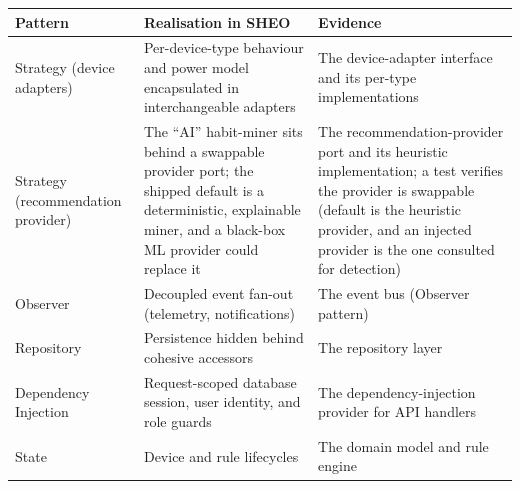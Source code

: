 \begin{center}
\begin{tabularx}{\linewidth}{@{}L{2.6cm} Y L{4.0cm}@{}}
\toprule
\textbf{Pattern} & \textbf{Realisation in SHEO} & \textbf{Evidence} \\
\midrule
Strategy (device adapters) & Per-device-type behaviour and power model encapsulated in interchangeable adapters & The device-adapter interface and its per-type implementations \\
Strategy (recommendation provider) & The ``AI'' habit-miner sits behind a swappable provider port; the shipped default is a deterministic, explainable miner, and a black-box ML provider could replace it & The recommendation-provider port and its heuristic implementation; a test verifies the provider is swappable (default is the heuristic provider, and an injected provider is the one consulted for detection) \\
Observer & Decoupled event fan-out (telemetry, notifications) & The event bus (Observer pattern) \\
Repository & Persistence hidden behind cohesive accessors & The repository layer \\
Dependency Injection & Request-scoped database session, user identity, and role guards & The dependency-injection provider for API handlers \\
State & Device and rule lifecycles & The domain model and rule engine \\
\bottomrule
\end{tabularx}
\end{center}
